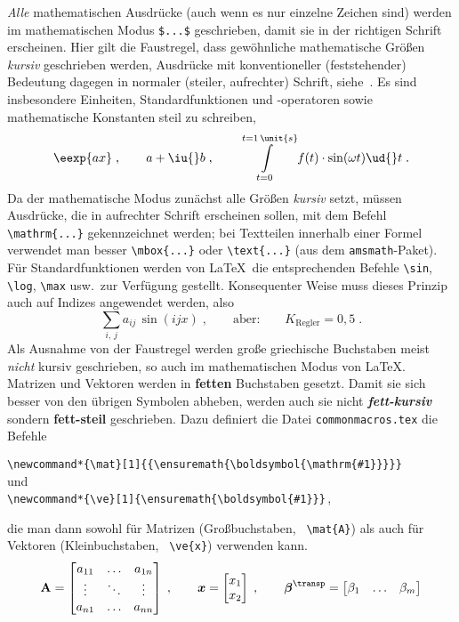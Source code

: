 \emph{Alle} mathematischen Ausdrücke (auch wenn es nur einzelne Zeichen sind) werden im mathematischen Modus \verb|$...$| geschrieben, damit sie in der
richtigen Schrift erscheinen.
Hier gilt die Faustregel, dass gewöhnliche mathematische Größen \emph{kursiv} geschrieben werden, Ausdrücke mit konventioneller (feststehender) Bedeutung dagegen in normaler (steiler, aufrechter) Schrift, siehe~\cite{DIN1338}.
Es sind insbesondere Einheiten, Standardfunktionen und -operatoren sowie mathematische Konstanten steil zu schreiben,
\begin{equation*}
	\eexp{ax}\;,\qquad a+\iu{}b\;,\qquad
	\int\limits_{t=0}^{t=1\,\unit{s}} f(t)\cdot\sin(\omega t)\ud{}t\;.
\end{equation*}
Da der mathematische Modus zunächst alle Größen \emph{kursiv} setzt, müssen Ausdrücke, die in aufrechter Schrift erscheinen sollen, mit dem Befehl
\verb|\mathrm{...}| gekennzeichnet werden; bei Textteilen innerhalb einer Formel verwendet man besser \verb|\mbox{...}| oder \verb|\text{...}| (aus dem
\verb|amsmath|-Paket).
Für Standardfunktionen werden von \LaTeX\ die entsprechenden Befehle \verb|\sin|, \verb|\log|, \verb|\max| usw.\ zur Verfügung gestellt.
Konsequenter Weise muss dieses Prinzip auch auf Indizes angewendet werden, also \zB
\begin{equation*}
	\sum_{i,\,j}a_{ij}\,\sin(ijx)\;,\qquad\text{aber:}\qquad
	K_\mathrm{Regler} = 0,5\;.
\end{equation*}
Als Ausnahme von der \og Faustregel werden große griechische Buchstaben meist \emph{nicht} kursiv geschrieben, so auch im mathematischen Modus von
\LaTeX.
Matrizen und Vektoren werden in \textbf{fetten} Buchstaben gesetzt.
Damit sie sich besser von den übrigen Symbolen abheben, werden auch sie nicht \textbf{\emph{fett-kursiv}} sondern \textbf{fett-steil} geschrieben.
Dazu definiert die Datei \texttt{commonmacros.tex} die Befehle
\begin{center}
	\verb|\newcommand*{\mat}[1]{{\ensuremath{\boldsymbol{\mathrm{#1}}}}}|\\
	und\\
	\verb|\newcommand*{\ve}[1]{\ensuremath{\boldsymbol{#1}}}|\,,
\end{center}
die man dann sowohl für Matrizen (Großbuchstaben, \zB\ \verb|\mat{A}|) als auch für Vektoren (Kleinbuchstaben, \zB\ \verb|\ve{x}|) verwenden kann.
\begin{equation*}
	\mat{A} = \begin{bmatrix}
		a_{11} & \ldots & a_{1n}\\
		\vdots & \ddots & \vdots\\
		a_{n1} & \ldots & a_{nn}
	\end{bmatrix}\;,\qquad
	\ve{x} = \begin{bmatrix}
		x_1\\
		x_2
	\end{bmatrix}\;,\qquad
	\ve{\beta}^\transp = \begin{bmatrix}\beta_1	&	\ldots	&	\beta_m\end{bmatrix}
\end{equation*}

